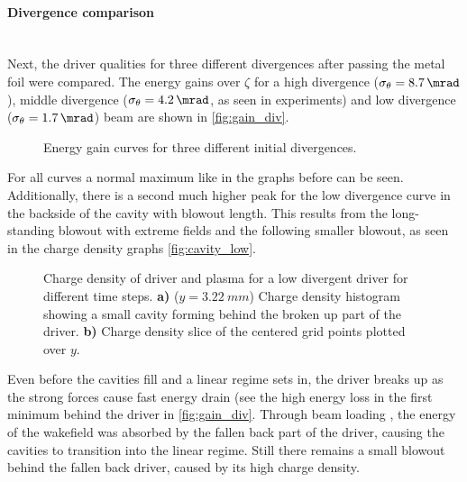 \documentclass[bachelor_thesis]{subfiles}
\begin{document}
\paragraph*{Divergence comparison}\label{para:div_comp}\hspace{0pt} \\
Next, the driver qualities for three different divergences after passing the metal foil were compared. The energy gains over $\zeta$ for a high divergence ($\sigma_{\theta}=\qty{8.7}{\mrad}$), middle divergence ($\sigma_{\theta}=\qty{4.2}{\mrad}$, as seen in experiments) 
and low divergence ($\sigma_{\theta}=\qty{1.7}{\mrad}$) beam are shown in \autoref{fig:gain_div}.
\begin{figure}
	\centering
	
	\caption{Energy gain curves for three different initial divergences.}
	\label{fig:gain_div}
\end{figure}
For all curves a normal maximum like in the graphs before can be seen. Additionally, there is a second much higher peak for the low divergence curve in the backside of the cavity with blowout length.
This results from the long-standing blowout with extreme fields and the following smaller blowout, as seen in the charge density graphs \autoref{fig:cavity_low}.

\begin{figure}
	\centering
	
	\caption{Charge density of driver and plasma for a low divergent driver for different time steps.
	\textbf{a)} ($y=\qty{3.22}{mm}$) Charge density histogram showing a small cavity forming behind the broken up part of the driver.
	\textbf{b)} Charge density slice of the centered grid points plotted over $y$. 
	}
	\label{fig:cavity_low}
\end{figure}
Even before the cavities fill and a linear regime sets in, the driver breaks up as the strong forces cause fast energy drain (see the high energy loss in the first minimum behind the driver in \autoref{fig:gain_div}.
Through beam loading \cite{Kirchen2021, Goetzfried2020}, the energy of the wakefield was absorbed by the fallen back part of the driver, causing the cavities to transition into the linear regime. 
Still there remains a small blowout behind the  fallen back driver, caused by its high charge density.
\end{document}
